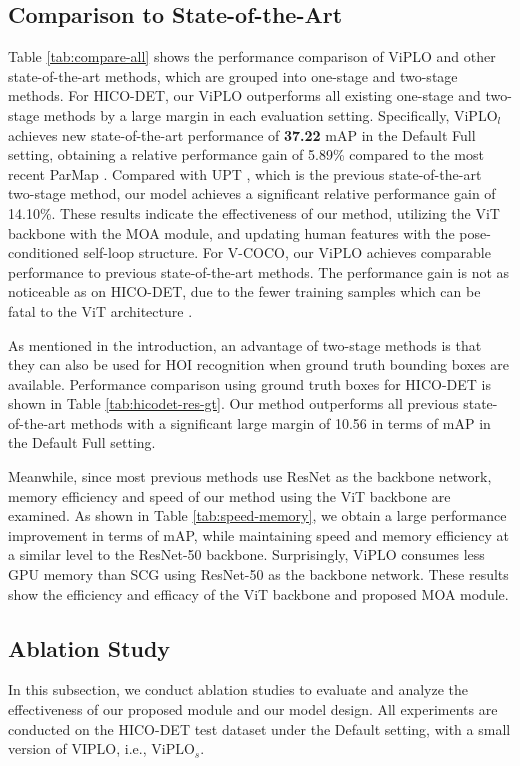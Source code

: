 \documentclass[10pt,twocolumn,letterpaper]{article}
\begin{document}
\subsection{Comparison to State-of-the-Art}
\label{sec:4-2}
Table \ref{tab:compare-all} shows the performance comparison of ViPLO and other state-of-the-art methods, which are grouped into one-stage and two-stage methods. For HICO-DET, our $\textrm{ViPLO}$ outperforms all existing one-stage and two-stage methods by a large margin in each evaluation setting. Specifically, $\textrm{ViPLO}_{l}$ achieves new state-of-the-art performance of \textbf{37.22} mAP in the Default Full setting, obtaining a relative performance gain of 5.89\% compared to the most recent ParMap \cite{wu2022mining}. Compared with UPT \cite{zhang2022efficient}, which is the previous state-of-the-art two-stage method, our model achieves a significant relative performance gain of 14.10\%. These results indicate the effectiveness of our method, utilizing the ViT backbone with the MOA module, and updating human features with the pose-conditioned self-loop structure. For V-COCO, our $\textrm{ViPLO}$ achieves comparable performance to previous state-of-the-art methods. The performance gain is not as noticeable as on HICO-DET, due to the fewer training samples which can be fatal to the ViT architecture \cite{touvron2021training}.

As mentioned in the introduction, an advantage of two-stage methods is that
they can also be used for HOI recognition when ground truth bounding boxes are available. Performance comparison using ground truth boxes for HICO-DET is shown in Table \ref{tab:hicodet-res-gt}. Our method outperforms all previous state-of-the-art methods with a significant large margin of 10.56 in terms of mAP in the Default Full setting. 

Meanwhile, since most previous methods use ResNet as the backbone network, memory efficiency and speed of our method using the ViT backbone are examined. As shown in Table \ref{tab:speed-memory}, we obtain a large performance improvement in terms of mAP, while maintaining speed and memory efficiency at a similar level to the ResNet-50 backbone. Surprisingly, $\textrm{ViPLO}$ consumes less GPU memory than SCG using ResNet-50 as the backbone network. These results show the efficiency and efficacy of the ViT backbone and proposed MOA module. 






\subsection{Ablation Study}
\label{sec:4-3}
In this subsection, we conduct ablation studies to evaluate and analyze the effectiveness of our proposed module and our model design. All experiments are conducted on the HICO-DET test dataset under the Default setting, with a small version of VIPLO, i.e., $\textrm{ViPLO}_{s}$.
\end{document}
